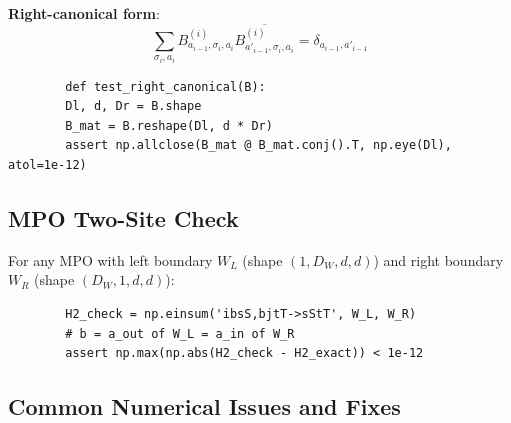 \documentclass[aps,prb,onecolumn,scriptaddress]{revtex4-2}
\begin{document}
	\textbf{Right-canonical form}:
	\begin{equation}
		\sum_{\sigma_i, a_i} B^{(i)}_{a_{i-1}, \sigma_i, a_i}
		\overline{B^{(i)}_{a'_{i-1}, \sigma_i, a_i}} = \delta_{a_{i-1}, a'_{i-1}}
	\end{equation}
	\begin{verbatim}
		def test_right_canonical(B):
		Dl, d, Dr = B.shape
		B_mat = B.reshape(Dl, d * Dr)
		assert np.allclose(B_mat @ B_mat.conj().T, np.eye(Dl), atol=1e-12)
	\end{verbatim}
	
	\subsection{MPO Two-Site Check}
	
	For any MPO with left boundary $W_L$ (shape $(1, D_W, d, d)$) and
	right boundary $W_R$ (shape $(D_W, 1, d, d)$):
	\begin{verbatim}
		H2_check = np.einsum('ibsS,bjtT->sStT', W_L, W_R)
		# b = a_out of W_L = a_in of W_R
		assert np.max(np.abs(H2_check - H2_exact)) < 1e-12
	\end{verbatim}
	
	\subsection{Common Numerical Issues and Fixes}
	
\end{document}
